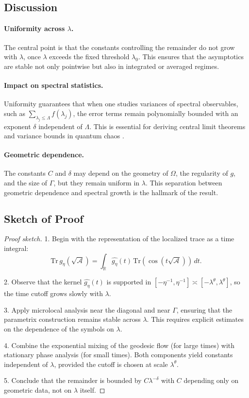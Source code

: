 \subsection{Discussion}

\paragraph{Uniformity across $\lambda$.}
The central point is that the constants controlling the remainder do not
grow with $\lambda$, once $\lambda$ exceeds the fixed threshold $\lambda_0$.
This ensures that the asymptotics are stable not only pointwise but also
in integrated or averaged regimes.

\paragraph{Impact on spectral statistics.}
Uniformity guarantees that when one studies variances of spectral
observables, such as $\sum_{\lambda_j \leq \Lambda} f(\lambda_j)$,
the error terms remain polynomially bounded with an exponent $\delta$
independent of $\Lambda$.  
This is essential for deriving central limit theorems and variance
bounds in quantum chaos \cite{Hejhal1994, Lindenstrauss2006, Dyatlov2016}.

\paragraph{Geometric dependence.}
The constants $C$ and $\delta$ may depend on the geometry of $\Omega$,
the regularity of $g$, and the size of $\Gamma$, but they remain
uniform in $\lambda$.  
This separation between geometric dependence and spectral growth is the
hallmark of the result.

\subsection{Sketch of Proof}

\begin{proof}[Proof sketch]
1. Begin with the representation of the localized trace as a time integral:
\[
\mathrm{Tr}\, g_\eta(\sqrt{\mathcal{A}}) =
\int_{\mathbb{R}} \widehat{g_\eta}(t)\,
\mathrm{Tr}(\cos(t\sqrt{\mathcal{A}}))\, dt.
\]

2. Observe that the kernel $\widehat{g_\eta}(t)$ is supported in
$[-\eta^{-1},\eta^{-1}] \asymp [-\lambda^\theta,\lambda^\theta]$,
so the time cutoff grows slowly with $\lambda$.

3. Apply microlocal analysis near the diagonal and near $\Gamma$,
ensuring that the parametrix construction remains stable across $\lambda$.
This requires explicit estimates on the dependence of the symbols
on $\lambda$.

4. Combine the exponential mixing of the geodesic flow (for large times)
with stationary phase analysis (for small times). Both components
yield constants independent of $\lambda$, provided the cutoff
is chosen at scale $\lambda^\theta$.

5. Conclude that the remainder is bounded by $C\lambda^{-\delta}$ with
$C$ depending only on geometric data, not on $\lambda$ itself.
\end{proof}

